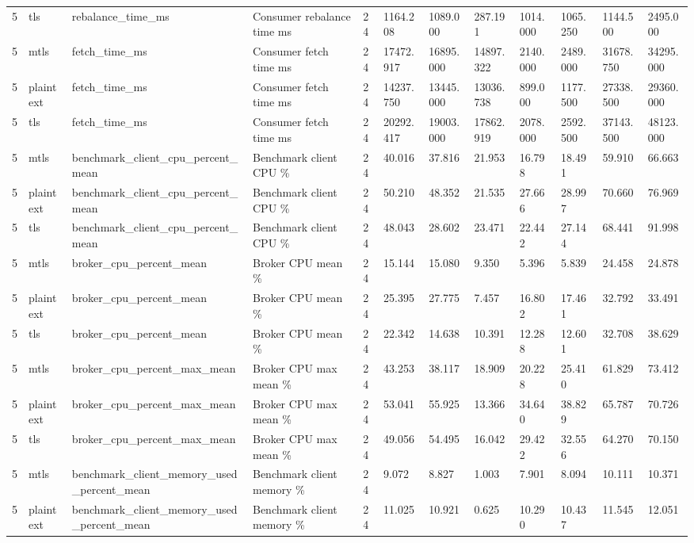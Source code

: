 \begin{longtable}{llllllllllll}
5 & tls & rebalance\_time\_ms & Consumer rebalance time ms & 24 & 1164.208 & 1089.000 & 287.191 & 1014.000 & 1065.250 & 1144.500 & 2495.000 \\
5 & mtls & fetch\_time\_ms & Consumer fetch time ms & 24 & 17472.917 & 16895.000 & 14897.322 & 2140.000 & 2489.000 & 31678.750 & 34295.000 \\
5 & plaintext & fetch\_time\_ms & Consumer fetch time ms & 24 & 14237.750 & 13445.000 & 13036.738 & 899.000 & 1177.500 & 27338.500 & 29360.000 \\
5 & tls & fetch\_time\_ms & Consumer fetch time ms & 24 & 20292.417 & 19003.000 & 17862.919 & 2078.000 & 2592.500 & 37143.500 & 48123.000 \\
5 & mtls & benchmark\_client\_cpu\_percent\_mean & Benchmark client CPU \% & 24 & 40.016 & 37.816 & 21.953 & 16.798 & 18.491 & 59.910 & 66.663 \\
5 & plaintext & benchmark\_client\_cpu\_percent\_mean & Benchmark client CPU \% & 24 & 50.210 & 48.352 & 21.535 & 27.666 & 28.997 & 70.660 & 76.969 \\
5 & tls & benchmark\_client\_cpu\_percent\_mean & Benchmark client CPU \% & 24 & 48.043 & 28.602 & 23.471 & 22.442 & 27.144 & 68.441 & 91.998 \\
5 & mtls & broker\_cpu\_percent\_mean & Broker CPU mean \% & 24 & 15.144 & 15.080 & 9.350 & 5.396 & 5.839 & 24.458 & 24.878 \\
5 & plaintext & broker\_cpu\_percent\_mean & Broker CPU mean \% & 24 & 25.395 & 27.775 & 7.457 & 16.802 & 17.461 & 32.792 & 33.491 \\
5 & tls & broker\_cpu\_percent\_mean & Broker CPU mean \% & 24 & 22.342 & 14.638 & 10.391 & 12.288 & 12.601 & 32.708 & 38.629 \\
5 & mtls & broker\_cpu\_percent\_max\_mean & Broker CPU max mean \% & 24 & 43.253 & 38.117 & 18.909 & 20.228 & 25.410 & 61.829 & 73.412 \\
5 & plaintext & broker\_cpu\_percent\_max\_mean & Broker CPU max mean \% & 24 & 53.041 & 55.925 & 13.366 & 34.640 & 38.829 & 65.787 & 70.726 \\
5 & tls & broker\_cpu\_percent\_max\_mean & Broker CPU max mean \% & 24 & 49.056 & 54.495 & 16.042 & 29.422 & 32.556 & 64.270 & 70.150 \\
5 & mtls & benchmark\_client\_memory\_used\_percent\_mean & Benchmark client memory \% & 24 & 9.072 & 8.827 & 1.003 & 7.901 & 8.094 & 10.111 & 10.371 \\
5 & plaintext & benchmark\_client\_memory\_used\_percent\_mean & Benchmark client memory \% & 24 & 11.025 & 10.921 & 0.625 & 10.290 & 10.437 & 11.545 & 12.051 \\

\end{longtable}
